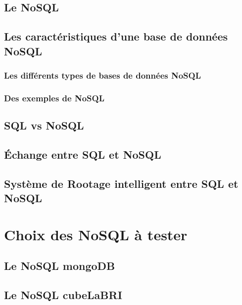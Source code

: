 

\section{Le \textsf{NoSQL}}


\section{Les caractéristiques d'une base de données \textsf{NoSQL}}


\subsection{Les différents types de bases de données \textsf{NoSQL}}\label{categorie} 
 

\subsection{Des exemples de \textsf{NoSQL}}


\section{\textsf{SQL} vs \textsf{NoSQL}}


\section{Échange entre \textsf{SQL} et \textsf{NoSQL}}


\section{Système de Rootage intelligent entre \textsf{SQL} et \textsf{NoSQL}}


\chapter{Choix des \textsf{NoSQL} à tester}
\section{Le \textsf{NoSQL mongoDB}}\label{mongoDB}

\section{Le \textsf{NoSQL} \textsf{cubeLaBRI}}


